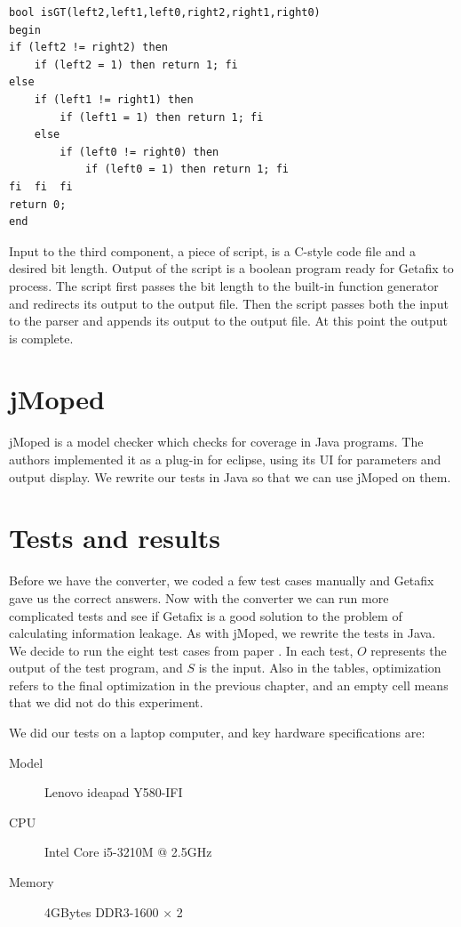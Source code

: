 \lstset{language=C}  
\begin{lstlisting}[float=h, caption={Greater than operator as a function in boolean program with bit length of 2.},label=lst:isGT]
bool isGT(left2,left1,left0,right2,right1,right0)
begin
if (left2 != right2) then
	if (left2 = 1) then return 1; fi
else 
	if (left1 != right1) then
		if (left1 = 1) then	return 1; fi
	else 
		if (left0 != right0) then
			if (left0 = 1) then	return 1; fi
fi	fi	fi
return 0;
end
\end{lstlisting}

Input to the third component, a piece of script, is a C-style code file and a desired bit length. Output of the script is a boolean program ready for Getafix to process. The script first passes the bit length to the built-in function generator and redirects its output to the output file. Then the script passes both the input to the parser and appends its output to the output file. At this point the output is complete.

\section {jMoped}
jMoped is a model checker which checks for coverage in Java programs. The authors implemented it as a plug-in for eclipse, using its UI for parameters and output display. We rewrite our tests in Java so that we can use jMoped on them.

\section{Tests and results}
Before we have the converter, we coded a few test cases manually and Getafix gave us the correct answers. Now with the converter we can run more complicated tests and see if Getafix is a good solution to the problem of calculating information leakage. As with jMoped, we rewrite the tests in Java. We decide to run the eight test cases from paper \cite{Plas11}. In each test, $O$ represents the output of the test program, and $S$ is the input. Also in the tables, optimization refers to the final optimization in the previous chapter, and an empty cell means that we did not do this experiment.

We did our tests on a laptop computer, and key hardware specifications are:
\begin{description}
  \item[Model] Lenovo ideapad Y580-IFI
  \item[CPU] Intel Core i5-3210M @ 2.5GHz
  \item[Memory] 4GBytes DDR3-1600 $\times$ 2
\end{description}

